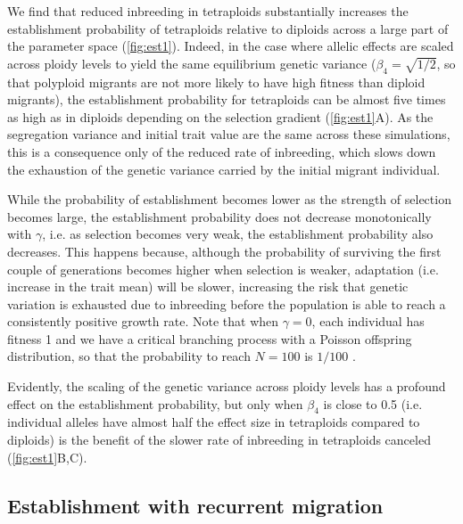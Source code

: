 \documentclass[12pt,a4paper]{article}
\begin{document}
We find that reduced inbreeding in tetraploids substantially increases the
establishment probability of tetraploids relative to diploids across a large
part of the parameter space (\cref{fig:est1}).
Indeed, in the case where allelic effects are scaled across ploidy levels
to yield the same equilibrium genetic variance ($\beta_4 = \sqrt{1/2}$, so that
polyploid migrants are not more likely to have high fitness than diploid
migrants), the establishment probability for tetraploids can be almost five
times as high as in diploids depending on the selection gradient
(\cref{fig:est1}A).
As the segregation variance and initial trait value are the same across these
simulations, this is a consequence only of the reduced rate of inbreeding,
which slows down the exhaustion of the genetic variance carried by the initial
migrant individual.

While the probability of establishment becomes lower as the strength of
selection becomes large, the establishment probability does not decrease
monotonically with $\gamma$, i.e. as selection becomes very weak, the
establishment probability also decreases.
This happens because, although the probability of surviving the first couple of
generations becomes higher when selection is weaker, adaptation (i.e. increase
in the trait mean) will be slower,
increasing the risk that genetic variation is exhausted due to inbreeding before the
population is able to reach a consistently positive growth rate.
Note that when $\gamma = 0$, each individual has fitness 1 and we have a
critical branching process with a Poisson offspring distribution, so that the
probability to reach $N=100$ is $1/100$ \citep{barton2018}.  

Evidently, the scaling of the genetic variance across ploidy levels has a
profound effect on the establishment probability, but only when $\beta_4$ is
close to 0.5 (i.e. individual alleles have almost half the effect size in
tetraploids compared to diploids) is the benefit of the slower rate of
inbreeding in tetraploids canceled (\cref{fig:est1}B,C).



\subsection*{Establishment with recurrent migration}
\end{document}
